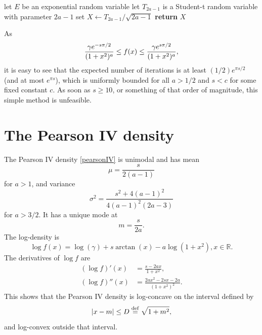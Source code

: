 \documentclass[12pt,reqno,tbtags]{amsart}
\newcommand{\inlaw}{\buildrel {\mathcal L} \over =}
\newcommand{\RR}{\mathbb{R}}
\newcommand{\isdef}{\buildrel {\rm def} \over =}
\begin{document}
\begin{algorithm}[H]
\caption{PearsonIV generator by rejection from Student-t law}\label{Pearson1}
\begin{algorithmic}[1]
\Repeat 
\State let $E$ be an exponential random variable 
\State let $T_{2a-1}$ is a Student-t random variable with parameter $2a-1$
\State set $X \leftarrow T_{2a-1}/\sqrt{2a-1}$ 
\State \textbf {return} $X$ 
\Comment{$X \inlaw P_{a,s}$ }
\end{algorithmic}
\end{algorithm}


As 
$$
{ \gamma e^{-s\pi/2} \over (1+x^2)^a} \le f(x) \le {\gamma e^{s\pi/2} \over (1+x^2)^a},
$$
it is easy to see that the expected number of iterations is 
at least $(1/2) e^{\pi s/2}$ (and at most $e^{\pi s}$),
which is uniformly bounded for all $a > 1/2$ and $ s < c$ for some fixed constant $ c$.
As soon as $s \ge 10$, or something of that order of magnitude, this 
simple method is unfeasible.








\section{The Pearson IV density}\label{pearson4}

The Pearson IV density \eqref{pearsonIV} is unimodal and has mean
$$
\mu = \frac{s}{2(a-1)}
$$
for $a > 1$, and variance
$$
\sigma^2 = \frac{s^2 + 4(a-1)^2}{4 (a-1)^2 (2a-3)}
$$
for $a > 3/2$.
It has a unique mode at
$$
m = \frac{s}{2a}.
$$
The log-density is
$$
\log f(x) = \log (\gamma) + s \arctan (x) -a \log( 1+x^2 ), x \in \RR.
$$
The derivatives of $\log f$ are
\begin{align}
 (\log f)'(x) &= \frac{s-2ax}{1+x^2}, \\
 (\log f)''(x) &= \frac{2ax^2 -2sx -2a }{(1+x^2)^2} .   
\end{align}
This shows that the Pearson IV density is log-concave on the interval defined by
$$
| x - m | \le D \isdef \sqrt{ 1+m^2 },
$$
and log-convex outside that interval. 






\end{document}
